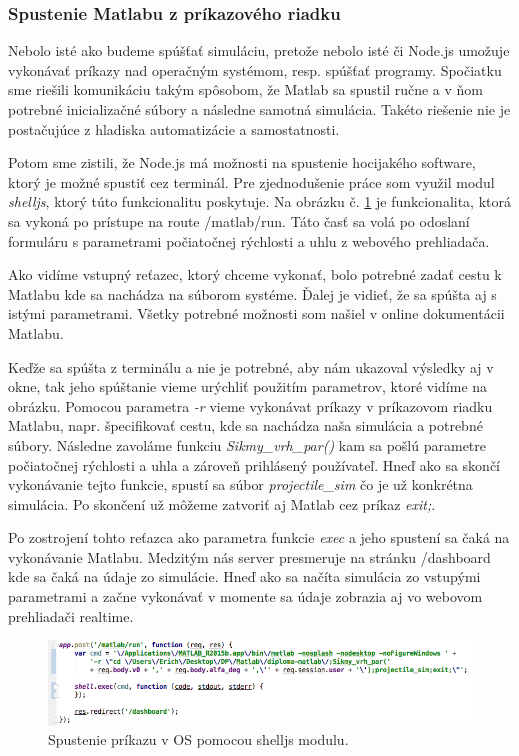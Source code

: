 \subsubsection{Spustenie Matlabu z príkazového riadku}
Nebolo isté ako budeme spúšťať simuláciu, pretože nebolo isté či Node.js umožuje vykonávať príkazy nad operačným systémom, resp. spúšťať programy. Spočiatku sme riešili komunikáciu takým spôsobom, že Matlab sa spustil ručne a v ňom potrebné inicializačné súbory a následne samotná simulácia. Takéto riešenie nie je postačujúce z hladiska automatizácie a samostatnosti.

Potom sme zistili, že Node.js má možnosti na spustenie hocijakého software, ktorý je možné spustiť cez terminál. Pre zjednodušenie práce som využil modul \textit{shelljs}, ktorý túto funkcionalitu poskytuje. Na obrázku č. \ref{img-express-shelljs} je funkcionalita, ktorá sa vykoná po prístupe na route /matlab/run. Táto časť sa volá po odoslaní formuláru s parametrami počiatočnej rýchlosti a uhlu z webového prehliadača.

Ako vidíme vstupný reťazec, ktorý chceme vykonať, bolo potrebné zadať cestu k Matlabu kde sa nachádza na súborom systéme. Ďalej je vidieť, že sa spúšta aj s istými parametrami. Všetky potrebné možnosti som našiel v online dokumentácii Matlabu. \cite{matlab-macos}

Keďže sa spúšta z terminálu a nie je potrebné, aby nám ukazoval výsledky aj v okne, tak jeho spúštanie vieme urýchliť použitím parametrov, ktoré vidíme na obrázku. Pomocou parametra \textit{-r} vieme vykonávat príkazy v príkazovom riadku Matlabu, napr. špecifikovať cestu, kde sa nachádza naša simulácia a potrebné súbory. Následne zavoláme funkciu \textit{Sikmy\_vrh\_par()} kam sa pošlú parametre počiatočnej rýchlosti a uhla a zároveň prihlásený používateľ. Hneď ako sa skončí vykonávanie tejto funkcie, spustí sa súbor \textit{projectile\_sim} čo je už konkrétna simulácia. Po skončení už môžeme zatvoriť aj Matlab cez príkaz \textit{exit;}.

Po zostrojení tohto reťazca ako parametra funkcie \textit{exec} a jeho spustení sa čaká na vykonávanie Matlabu. Medzitým nás server presmeruje na stránku /dashboard kde sa čaká na údaje zo simulácie. Hneď ako sa načíta simulácia zo vstupými parametrami a začne vykonávať v momente sa údaje zobrazia aj vo webovom prehliadači realtime.

\begin{figure}[H]
  \centering
  \includegraphics[scale=0.6]{img/code/express-shelljs.png}
  \caption{Spustenie príkazu v OS pomocou shelljs modulu.}
  \label{img-express-shelljs}
\end{figure}

